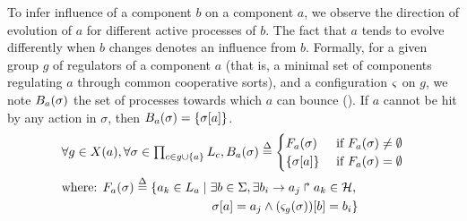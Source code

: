 To infer influence of a component $b$ on a component $a$,
we observe the direction of evolution of $a$ for different active processes of $b$.
The fact that $a$ tends to evolve differently when $b$ changes denotes an influence from $b$.
Formally, for a given group $g$ of regulators of a component $a$
(that is, a minimal set of components regulating $a$ through common cooperative sorts),
and a configuration $\varsigma$ on $g$, we note
$B_a(\sigma)$ the set of processes towards which $a$ can bounce ().
If $a$ cannot be hit by any action in $\sigma$, then $B_a(\sigma) = \{ {\sigma[a]} \}$.
%
\begin{align}
\begin{split}\label{eq:possible-bounces}
  &\forall g \in X(a), \forall \sigma \in \textstyle\prod_{c\in g \cup \{ a \}} L_c,
  B_a(\sigma) \stackrel{\Delta}= 
  \begin{cases}
    F_a(\sigma)
      & \text{ if } F_a(\sigma) \neq \emptyset\\
    \{ {\sigma[a]} \}
      & \text{ if } F_a(\sigma) = \emptyset
  \end{cases}\\
  &\text{where: } F_a(\sigma) \stackrel{\Delta}= \{ a_k \in L_a \mid \exists b \in \Sigma, \exists b_i\rightarrow a_j\Rsh a_k \in \mathcal{H},\\
  & \qquad\qquad\qquad\qquad\qquad\qquad {\sigma[a]} = a_j \wedge {(\varsigma_{g}(\sigma))[b]} = b_i \}\\
\end{split}
\end{align}

